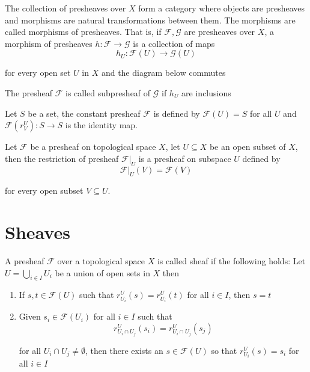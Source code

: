 \begin{definition}
	The collection of presheaves over $X$ form a category where objects are presheaves and morphisms are natural transformations between them. The morphisms are called morphisms of presheaves. That is, if $\mathcal{F}, \mathcal{G}$ are presheaves over $X$, a morphism of presheaves $h: \mathcal{F} \to \mathcal{G}$ is a collection of maps 
	$$
		h_U: \mathcal{F}(U) \to \mathcal{G}(U)
	$$
	
	for every open set $U$ in $X$ and the diagram below commutes
	\begin{center}
	\end{center}
	
	The presheaf $\mathcal{F}$ is called subpresheaf of $\mathcal{G}$ if $h_U$ are inclusions
\end{definition}

\begin{remark}
	Let $S$ be a set, the constant presheaf $\mathcal{F}$ is defined by $\mathcal{F}(U) = S$ for all $U$ and $\mathcal{F}(r^U_V): S \to S$ is the identity map.
\end{remark}

\begin{definition}
	Let $\mathcal{F}$ be a presheaf on topological space $X$, let $U \subseteq X$ be an open subset of $X$, then the restriction of presheaf $\mathcal{F}\vert_{U}$ is a presheaf on subspace $U$ defined by
	$$
	\mathcal{F}\vert_{U}(V) = \mathcal{F}(V)
	$$
	
	for every open subset $V \subseteq U$.
\end{definition}

\section{Sheaves}

\begin{definition}[sheaf]
	A presheaf $\mathcal{F}$ over a topological space $X$ is called sheaf if the following holds: Let $U = \bigcup_{i \in I} U_i$ be a union of open sets in $X$ then
	\begin{enumerate}
		\item If $s, t \in \mathcal{F}(U)$ such that $r^U_{U_i} (s) = r^U_{U_i} (t)$ for all $i \in I$, then $s = t$
		
		\item Given $s_i \in \mathcal{F}(U_i)$ for all $i \in I$ such that
		$$
		r^{U}_{U_i \cap U_j} (s_i) = r^{U}_{U_i \cap U_j} (s_j)
		$$
		
		for all $U_i \cap U_j \neq \emptyset$, then there exists an $s \in \mathcal{F}(U)$ so that $r^U_{U_i}(s) = s_i$ for all $i \in I$
	\end{enumerate}
\end{definition}

